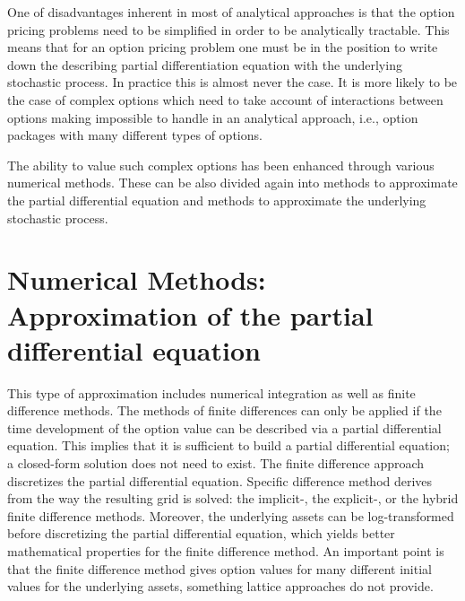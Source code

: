 \documentclass[11pt,letter]{article}
\theoremstyle{definition}
\theoremstyle{remark}
\numberwithin{equation}{section}
\begin{document}
One of disadvantages inherent in most of analytical approaches is that the option pricing problems need to be simplified in order to be analytically tractable. This means that for an option pricing problem one must be in the position to write down the describing partial differentiation equation with the underlying stochastic process. In practice this is almost never the case. It is more likely to be the case of complex options which need to take account of interactions between options making impossible to handle in an analytical approach, i.e., option packages with many different types of options.

The ability to value such complex options has been enhanced through various numerical methods. These can be also divided again into methods to approximate the partial differential equation and methods to approximate the underlying stochastic process.

\section{Numerical Methods: Approximation of the partial differential equation}
    This type of approximation includes numerical integration as well as finite difference methods. The methods of finite differences can only be applied if the time development of the option value can be described via a partial differential equation. This implies that it is sufficient to build a partial differential equation; a closed-form solution does not need to exist. The finite difference approach discretizes the partial differential equation. Specific difference method derives from the way the resulting grid is solved: the implicit-, the explicit-, or the hybrid finite difference methods. Moreover, the underlying assets can be log-transformed before discretizing the partial differential equation, which yields better mathematical properties for the finite difference method. An important point is that the finite difference method gives option values for many different initial values for the underlying assets, something lattice approaches do not provide.
    
\end{document}
